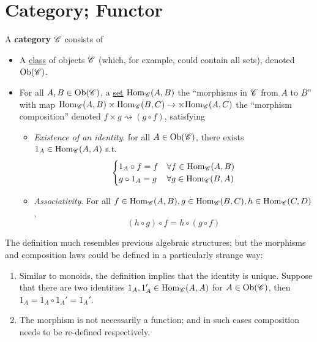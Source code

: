 \section{Category; Functor}

\begin{definition}[Category]
    A \textbf{category} $\mathscr{C}$ consists of 
    \begin{itemize}
        \item A \underline{class} of objects $\mathscr{C}$ (which, for example, could contain all sets), denoted $\mathrm{Ob}(\mathscr{C})$.
        \item For all $A, B \in \mathrm{Ob}(\mathscr{C})$, a \underline{set} $\mathrm{Hom}_{\mathscr{C}}(A, B)$ the ``morphisms in $\mathscr{C}$ from $A$ to $B$'' with map $\mathrm{Hom}_{\mathscr{C}}(A, B) \times \mathrm{Hom}_{\mathscr{C}}(B, C) \to \times \mathrm{Hom}_{\mathscr{C}}(A, C)$ the ``morphism composition'' denoted $f \times g \rightsquigarrow (g\circ f)$, satisfying
        \begin{itemize}
            \item \emph{Existence of an identity}. for all $A \in \mathrm{Ob}(\mathscr{C})$, there exists $1_{A} \in \mathrm{Hom}_{\mathscr{C}}(A, A)$ s.t. 
            \[
            \begin{cases}
                1_{A} \circ f = f & \forall f \in \mathrm{Hom}_{\mathscr{C}}(A, B) \\
                g \circ 1_{A} = g & \forall g \in \mathrm{Hom}_{\mathscr{C}}(B, A)
            \end{cases}
            \]
            \item \emph{Associativity}. For all $f \in \mathrm{Hom}_{\mathscr{C}}(A, B), g\in \mathrm{Hom}_{\mathscr{C}}(B, C), h \in \mathrm{Hom}_{\mathscr{C}}(C, D)$, 
            \[
                (h \circ g) \circ f = h \circ (g \circ f)
            \]
        \end{itemize}
    \end{itemize}
\end{definition}

\begin{remark} The definition much resembles previous algebraic structures; but the morphisms and composition laws could be defined in a particularly strange way: 
    \begin{enumerate}
        \item Similar to monoids, the definition implies that the identity is unique. Suppose that there are two identities $1_{A}, 1_{A}' \in \mathrm{Hom}_{\mathscr{C}}(A, A)$ for $A \in \mathrm{Ob}(\mathscr{C})$, then $1_A = 1_A \circ 1_A' = 1_A'$.
        \item The morphism is not necessarily a function; and in such cases composition needs to be re-defined respectively.
    \end{enumerate}
\end{remark}

